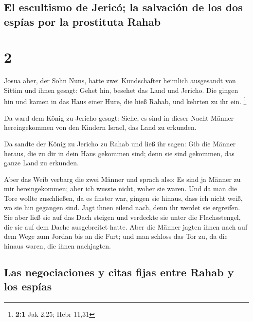 \hypertarget{el-escultismo-de-jericuxf3-la-salvaciuxf3n-de-los-dos-espuxedas-por-la-prostituta-rahab}{%
\subsection{El escultismo de Jericó; la salvación de los dos espías por
la prostituta
Rahab}\label{el-escultismo-de-jericuxf3-la-salvaciuxf3n-de-los-dos-espuxedas-por-la-prostituta-rahab}}

\hypertarget{section-1}{%
\section{2}\label{section-1}}

 Josua aber, der Sohn Nuns, hatte zwei Kundschafter
heimlich ausgesandt von Sittim und ihnen gesagt: Gehet hin, besehet das
Land und Jericho. Die gingen hin und kamen in das Haus einer Hure, die
hieß Rahab, und kehrten zu ihr ein. \footnote{\textbf{2:1} Jak 2,25;
  Hebr 11,31}

 Da ward dem König zu Jericho gesagt: Siehe, es sind in
dieser Nacht Männer hereingekommen von den Kindern Israel, das Land zu
erkunden.

 Da sandte der König zu Jericho zu Rahab und ließ ihr
sagen: Gib die Männer heraus, die zu dir in dein Haus gekommen sind;
denn sie sind gekommen, das ganze Land zu erkunden.

 Aber das Weib verbarg die zwei Männer und sprach also: Es
sind ja Männer zu mir hereingekommen; aber ich wusste nicht, woher sie
waren.  Und da man die Tore wollte zuschließen, da es
finster war, gingen sie hinaus, dass ich nicht weiß, wo sie hin gegangen
sind. Jagt ihnen eilend nach, denn ihr werdet sie ergreifen.
 Sie aber ließ sie auf das Dach steigen und verdeckte sie
unter die Flachsstengel, die sie auf dem Dache ausgebreitet hatte.
 Aber die Männer jagten ihnen nach auf dem Wege zum Jordan
bis an die Furt; und man schloss das Tor zu, da die hinaus waren, die
ihnen nachjagten.

\hypertarget{las-negociaciones-y-citas-fijas-entre-rahab-y-los-espuxedas}{%
\subsection{Las negociaciones y citas fijas entre Rahab y los
espías}\label{las-negociaciones-y-citas-fijas-entre-rahab-y-los-espuxedas}}

